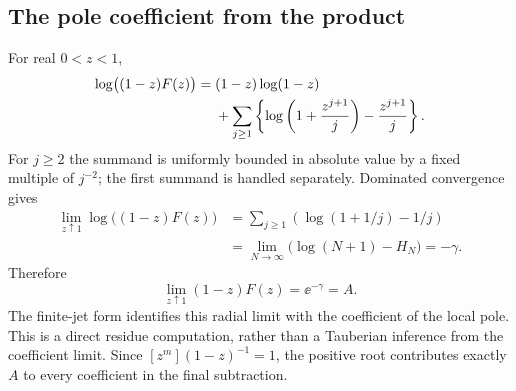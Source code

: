 \subsection{The pole coefficient from the product}
For real $0<z<1$,
\begin{align}\label{cms:eq:residue}
\log\bigl((1-z)F(z)\bigr)
={}&(1-z)\log(1-z)\\
&+\sum_{j\geq1}\left\{\log\left(1+\frac{z^{j+1}}j\right)
-\frac{z^{j+1}}j\right\}.\notag
\end{align}
For $j\geq2$ the summand is uniformly bounded in absolute value by a fixed multiple of $j^{-2}$; the first summand is handled separately. Dominated convergence gives
\begin{align*}
\lim_{z\uparrow1}\log\bigl((1-z)F(z)\bigr)
&=\sum_{j\geq1}\left(\log(1+1/j)-1/j\right)\\
&=\lim_{N\to\infty}\bigl(\log(N+1)-H_N\bigr)=-\gamma.
\end{align*}
Therefore
\begin{equation}\label{cms:eq:resvalue}
\lim_{z\uparrow1}(1-z)F(z)=\ee^{-\gamma}=A.
\end{equation}
The finite-jet form identifies this radial limit with the coefficient of the local pole. This is a direct residue computation, rather than a Tauberian inference from the coefficient limit. Since $[z^m](1-z)^{-1}=1$, the positive root contributes exactly $A$ to every coefficient in the final subtraction.
